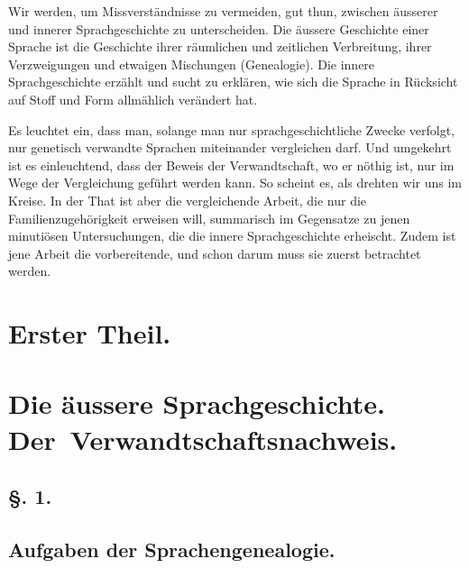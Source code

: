 Wir werden, um Missverständnisse zu vermeiden, gut thun, zwischen äusserer und innerer Sprachgeschichte zu unterscheiden. Die äussere Geschichte \label{sp.142} einer Sprache ist die Geschichte ihrer räumlichen und zeitlichen Verbreitung, ihrer Verzweigungen und etwaigen Mischungen (Genealogie). Die innere Sprachgeschichte erzählt und sucht zu erklären, wie sich die Sprache in Rücksicht auf Stoff und Form allmählich verändert hat.

Es leuchtet ein, dass man, solange man nur sprachgeschichtliche Zwecke verfolgt, nur genetisch verwandte Sprachen miteinander vergleichen darf. Und umgekehrt ist es einleuchtend, dass der Beweis der Verwandtschaft, wo er nöthig ist, nur im Wege der Vergleichung geführt werden kann. So scheint es, als drehten wir uns im Kreise. In der That ist aber die vergleichende Arbeit, die nur die Familienzugehörigkeit erweisen will, summarisch im Gegensatze zu jenen minutiösen Untersuchungen, die die innere Sprachgeschichte erheischt. Zudem ist jene Arbeit die vorbereitende, und schon darum muss sie zuerst betrachtet werden.

\section*{Erster Theil.}
\section*{Die äussere Sprachgeschichte. \mbox{Der Verwandtschaftsnachweis.}}
\subsection*{§. 1.}\label{III.I.I.1}
\subsection*{Aufgaben der Sprachengenealogie.}

